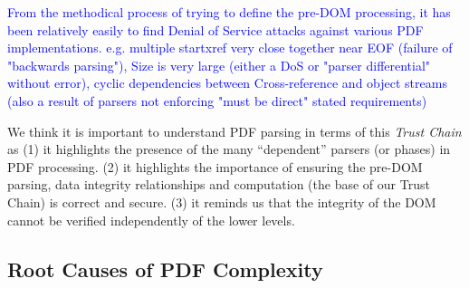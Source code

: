 

\textcolor{blue}{From the methodical process of trying to define the pre-DOM processing, it has been relatively easily to find Denial of Service attacks against various PDF implementations. e.g. multiple startxref very close together near EOF (failure of "backwards parsing"), Size is very large (either a DoS or "parser differential" without error), cyclic dependencies between Cross-reference and object streams (also a result of parsers not enforcing "must be direct" stated requirements)}



We think it is important to understand PDF parsing in terms of this
\emph{Trust Chain} as
%
(1) it highlights the presence of the many ``dependent'' parsers (or phases)
in PDF processing.
%
(2) it highlights the importance of ensuring the pre-DOM parsing, data integrity relationships and
computation (the base of our Trust Chain) is correct and secure.
%
(3) it reminds us that the integrity of the DOM cannot be verified
independently of the lower levels.


\subsection{Root Causes of PDF Complexity}

